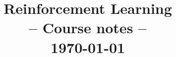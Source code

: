 \documentclass[12pt]{report}
\title{
{
	\sffamily\Huge
	\textbf{Reinforcement Learning}\\
	{\bluefont-- Course notes --}
}\\[2ex]
\normalsize\sffamily\today
}
\date{}
\begin{document}
\maketitle

\tableofcontents













\nocite{*}
\printbibliography
\end{document}
